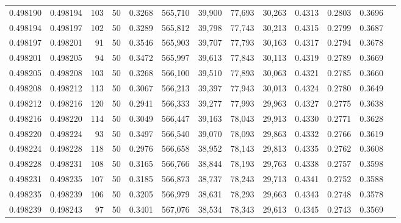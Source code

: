 \begin{tabular}{rrrrrrrrrrrrr}
0.498190 & 0.498194 &   103 &  50 &                                     0.3268 & 565,710 &  39,900 &  77,693 &  30,263 & 0.4313 & 0.2803 & 0.3696 \\
0.498194 & 0.498197 &   102 &  50 &                                     0.3289 & 565,812 &  39,798 &  77,743 &  30,213 & 0.4315 & 0.2799 & 0.3687 \\
0.498197 & 0.498201 &    91 &  50 &                                     0.3546 & 565,903 &  39,707 &  77,793 &  30,163 & 0.4317 & 0.2794 & 0.3678 \\
0.498201 & 0.498205 &    94 &  50 &                                     0.3472 & 565,997 &  39,613 &  77,843 &  30,113 & 0.4319 & 0.2789 & 0.3669 \\
0.498205 & 0.498208 &   103 &  50 &                                     0.3268 & 566,100 &  39,510 &  77,893 &  30,063 & 0.4321 & 0.2785 & 0.3660 \\
0.498208 & 0.498212 &   113 &  50 &                                     0.3067 & 566,213 &  39,397 &  77,943 &  30,013 & 0.4324 & 0.2780 & 0.3649 \\
0.498212 & 0.498216 &   120 &  50 &                                     0.2941 & 566,333 &  39,277 &  77,993 &  29,963 & 0.4327 & 0.2775 & 0.3638 \\
0.498216 & 0.498220 &   114 &  50 &                                     0.3049 & 566,447 &  39,163 &  78,043 &  29,913 & 0.4330 & 0.2771 & 0.3628 \\
0.498220 & 0.498224 &    93 &  50 &                                     0.3497 & 566,540 &  39,070 &  78,093 &  29,863 & 0.4332 & 0.2766 & 0.3619 \\
0.498224 & 0.498228 &   118 &  50 &                                     0.2976 & 566,658 &  38,952 &  78,143 &  29,813 & 0.4335 & 0.2762 & 0.3608 \\
0.498228 & 0.498231 &   108 &  50 &                                     0.3165 & 566,766 &  38,844 &  78,193 &  29,763 & 0.4338 & 0.2757 & 0.3598 \\
0.498231 & 0.498235 &   107 &  50 &                                     0.3185 & 566,873 &  38,737 &  78,243 &  29,713 & 0.4341 & 0.2752 & 0.3588 \\
0.498235 & 0.498239 &   106 &  50 &                                     0.3205 & 566,979 &  38,631 &  78,293 &  29,663 & 0.4343 & 0.2748 & 0.3578 \\
0.498239 & 0.498243 &    97 &  50 &                                     0.3401 & 567,076 &  38,534 &  78,343 &  29,613 & 0.4345 & 0.2743 & 0.3569 \\

\end{tabular}
